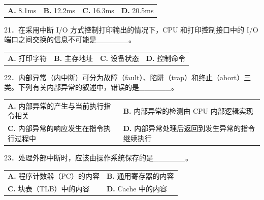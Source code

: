 \documentclass[UTF8,11pt]{ctexart}
\begin{document}
\begin{center}\begin{tabular}{>{\raggedright\arraybackslash}p{\dimexpr(\linewidth-8\tabcolsep)/4\relax}>{\raggedright\arraybackslash}p{\dimexpr(\linewidth-8\tabcolsep)/4\relax}>{\raggedright\arraybackslash}p{\dimexpr(\linewidth-8\tabcolsep)/4\relax}>{\raggedright\arraybackslash}p{\dimexpr(\linewidth-8\tabcolsep)/4\relax}}
\textbf{A.} 8.\allowbreak{}1ms & \textbf{B.} 12.\allowbreak{}2ms & \textbf{C.} 16.\allowbreak{}3ms & \textbf{D.} 20.\allowbreak{}5ms\\[.35em]\end{tabular}\end{center}

21．在采用中断 I/O 方式控制打印输出的情况下，CPU 和打印控制接口中的 I/O 端口之间交换的信息不可能是\_\_\_\_\_\_。


\begin{center}\begin{tabular}{>{\raggedright\arraybackslash}p{\dimexpr(\linewidth-8\tabcolsep)/4\relax}>{\raggedright\arraybackslash}p{\dimexpr(\linewidth-8\tabcolsep)/4\relax}>{\raggedright\arraybackslash}p{\dimexpr(\linewidth-8\tabcolsep)/4\relax}>{\raggedright\arraybackslash}p{\dimexpr(\linewidth-8\tabcolsep)/4\relax}}
\textbf{A.} 打印字符 & \textbf{B.} 主存地址 & \textbf{C.} 设备状态 & \textbf{D.} 控制命令\\[.35em]\end{tabular}\end{center}

22．内部异常（内中断）可分为故障（fault）、陷阱（trap）和终止（abort）三类。下列有关内部异常的叙述中，错误的是\_\_\_\_\_\_。


\begin{center}\begin{tabular}{>{\raggedright\arraybackslash}p{\dimexpr(\linewidth-4\tabcolsep)/2\relax}>{\raggedright\arraybackslash}p{\dimexpr(\linewidth-4\tabcolsep)/2\relax}}
\textbf{A.} 内部异常的产生与当前执行指令相关 & \textbf{B.} 内部异常的检测由 CPU 内部逻辑实现\\[.35em]
\textbf{C.} 内部异常的响应发生在指令执行过程中 & \textbf{D.} 内部异常处理后返回到发生异常的指令继续执行\\[.35em]\end{tabular}\end{center}

23．处理外部中断时，应该由操作系统保存的是\_\_\_\_\_\_。


\begin{center}\begin{tabular}{>{\raggedright\arraybackslash}p{\dimexpr(\linewidth-4\tabcolsep)/2\relax}>{\raggedright\arraybackslash}p{\dimexpr(\linewidth-4\tabcolsep)/2\relax}}
\textbf{A.} 程序计数器（PC）的内容 & \textbf{B.} 通用寄存器的内容\\[.35em]
\textbf{C.} 块表（TLB）中的内容 & \textbf{D.} Cache 中的内容\\[.35em]\end{tabular}\end{center}
\end{document}

